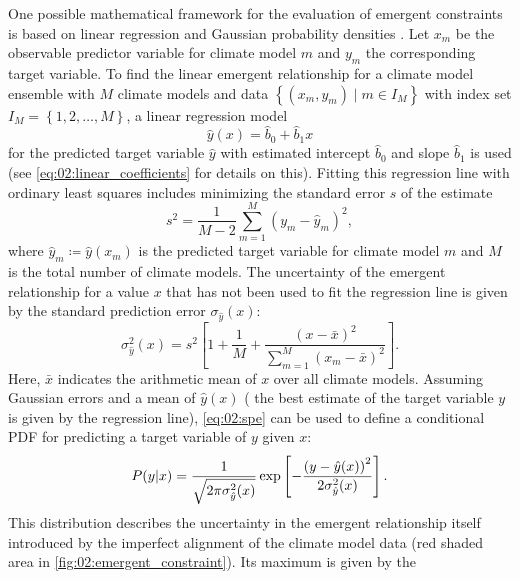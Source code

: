 One possible mathematical framework for the evaluation of emergent constraints
is based on linear regression and Gaussian probability densities
\autocite{Cox2013, Cox2018}. Let $x_m$ be the observable predictor variable for
climate model $m$ and $y_m$ the corresponding target variable. To find the
linear emergent relationship for a climate model ensemble with $M$ climate
models and data $\left\{ \left( x_m, y_m \right) \mid m \in I_M \right\}$ with
index set $I_M = \left\{ 1, 2, \ldots, M\right\}$, a linear
regression model
\begin{equation}
  \hat{y}(x) = \hat{b}_0 + \hat{b}_1 x
  \label{eq:02:linear_regression_y}
\end{equation}
for the predicted target variable $\hat{y}$ with estimated intercept
$\hat{b}_0$ and slope $\hat{b}_1$ is used (see \cref{eq:02:linear_coefficients}
for details on this). Fitting this regression line with ordinary least squares
includes minimizing the standard error $s$ of the estimate
\begin{equation}
  s^2 = \frac{1}{M - 2} \sum_{m=1}^M \left( y_m - \hat{y}_m \right)^2,
  \label{eq:02:sse}
\end{equation}
where $\hat{y}_m \coloneq \hat{y}(x_m)$ is the predicted target variable for
climate model $m$ and $M$ is the total number of climate models. The
uncertainty of the emergent relationship for a value $x$ that has not been used
to fit the regression line is given by the standard prediction error
$\sigma_{\hat{y}}(x)$:
\begin{equation}
  \sigma_{\hat{y}}^2(x) = s^2 \left[ 1 + \frac{1}{M} + \frac{\left( x - \bar{x}
    \right)^2}{\sum_{m=1}^M \left( x_m - \bar{x} \right)^2} \right].
  \label{eq:02:spe}
\end{equation}
Here, $\bar{x}$ indicates the arithmetic mean of $x$ over all climate models.
Assuming Gaussian errors and a mean of $\hat{y}(x)$ (\ie{} the best estimate of
the target variable $y$ is given by the regression line), \cref{eq:02:spe} can
be used to define a conditional \acf{PDF} for predicting a target variable of
$y$ given $x$:
\begin{equation}
  P(y|x) = \frac{1}{\sqrt{2 \pi \sigma_{\hat{y}}^2(x)}} \exp \left[
    -\frac{\left( y - \hat{y}(x) \right)^2}{2 \sigma_{\hat{y}}^2(x)} \right].
  \label{eq:02:pdf_y_given_x}
\end{equation}
This distribution describes the uncertainty in the emergent relationship itself
introduced by the imperfect alignment of the climate model data (red shaded
area in \cref{fig:02:emergent_constraint}). Its maximum is given by the
